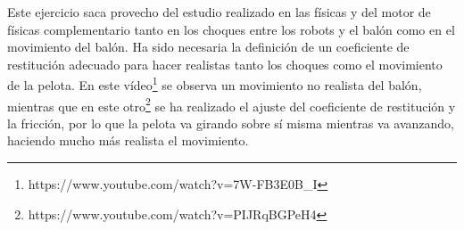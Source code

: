 Este ejercicio saca provecho del estudio realizado en las físicas y del motor de físicas complementario tanto en los choques entre los robots y el balón como en el movimiento del balón. Ha sido necesaria la definición de un coeficiente de restitución adecuado para hacer realistas tanto los choques como el movimiento de la pelota. En este vídeo\footnote{https://www.youtube.com/watch?v=7W-FB3E0B_I} se observa un movimiento no realista del balón, mientras que en este otro\footnote{https://www.youtube.com/watch?v=PIJRqBGPeH4} se ha realizado el ajuste del coeficiente de restitución y la fricción, por lo que la pelota va girando sobre sí misma mientras va avanzando, haciendo mucho más realista el movimiento.




